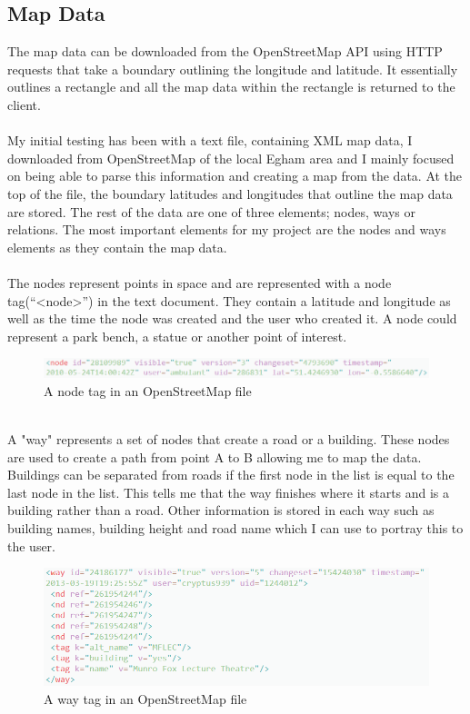 \documentclass[a4paper]{report}
\begin{document}
\subsection{Map Data}
The map data can be downloaded from the OpenStreetMap API using HTTP requests that take a boundary outlining the longitude and latitude. It essentially outlines a rectangle and all the map data within the rectangle is returned to the client. \cite{API}
\\\\
My initial testing has been with a text file, containing XML map data, I downloaded from OpenStreetMap of the local Egham area and I mainly focused on being able to parse this information and creating a map from the data. At the top of the file, the boundary latitudes and longitudes that outline the map data are stored. The rest of the data are one of three elements; nodes, ways or relations. The most important elements for my project are the nodes and ways elements as they contain the map data.
\\\\
The nodes represent points in space and are represented with a node tag(“<node>”) in the text document. They contain a latitude and longitude as well as the time the node was created and the user who created it. A node could represent a park bench, a statue or another point of interest. \cite{API}
\begin{figure}[h]
	\centering
	\includegraphics[scale=0.64]{node}
	\caption{A node tag in an OpenStreetMap file}
\end{figure}
\\A "way" represents a set of nodes that create a road or a building. These nodes are used to create a path from point A to B allowing me to map the data. Buildings can be separated from roads if the first node in the list is equal to the last node in the list. This tells me that the way finishes where it starts and is a building rather than a road. Other information is stored in each way such as building names, building height and road name which I can use to portray this to the user.
\begin{figure}[h]
	\centering
	\includegraphics[scale=0.7]{way}
	\caption{A way tag in an OpenStreetMap file}
\end{figure}
\end{document}
